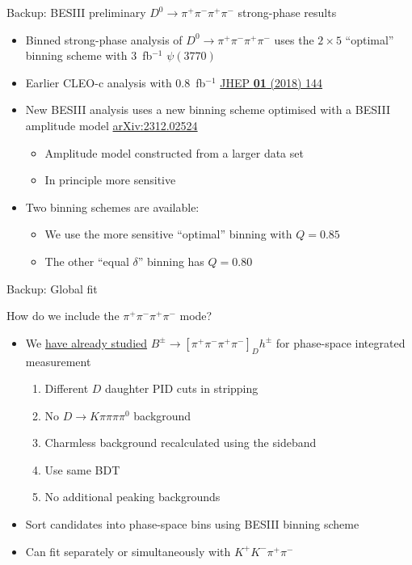 \documentclass[xcolor={dvipsnames}]{beamer}
\begin{document}
\begin{frame}{Backup: BESIII preliminary $D^0\to\pi^+\pi^-\pi^+\pi^-$ strong-phase results}
  \vspace{0.3cm}
  \begin{itemize}
    \setlength\itemsep{1.0em}
    \item{Binned strong-phase analysis of $D^0\to\pi^+\pi^-\pi^+\pi^-$ uses the $2\times5$ ``optimal'' binning scheme with $3$~fb$^{-1}$ $\psi(3770)$}
    \item{Earlier CLEO-c analysis with $0.8$~fb$^{-1}$ \href{https://link.springer.com/article/10.1007/JHEP01(2018)144}{JHEP \textbf{01} (2018) 144}}
    \item{New BESIII analysis uses a new binning scheme optimised with a BESIII amplitude model \href{https://arxiv.org/abs/2312.02524}{arXiv:2312.02524}}
    \begin{itemize}
      \item{Amplitude model constructed from a larger data set}
      \item{In principle more sensitive}
    \end{itemize}
    \item{Two binning schemes are available:}
    \begin{itemize}
      \item{We use the more sensitive ``optimal'' binning with $Q = 0.85$}
      \item{The other ``equal $\delta$'' binning has $Q = 0.80$}
    \end{itemize}
  \end{itemize}
\end{frame}

\begin{frame}{Backup: Global fit}
  \begin{center}
    {\large How do we include the $\pi^+\pi^-\pi^+\pi^-$ mode?}
  \end{center}
  \begin{itemize}
    \setlength\itemsep{1.5em}
    \item{We \underline{have already studied} $B^\pm\to[\pi^+\pi^-\pi^+\pi^-]_Dh^\pm$ for phase-space integrated measurement}
    \begin{enumerate}
      \setlength\itemsep{0.5em}
      \item{Different $D$ daughter PID cuts in stripping}
      \item{No $D\to K\pi\pi\pi\pi^0$ background}
      \item{Charmless background recalculated using the sideband}
      \item{Use same BDT}
      \item{No additional peaking backgrounds}
    \end{enumerate}
    \item{Sort candidates into phase-space bins using BESIII binning scheme}
    \item{Can fit separately or simultaneously with $K^+K^-\pi^+\pi^-$}
  \end{itemize}
\end{frame}
\end{document}
